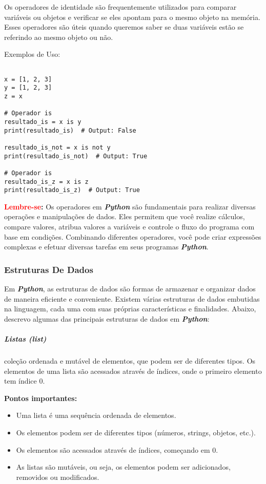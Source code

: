 \documentclass[a4paper, 12pt, onecolumn,singlespacing]{article}
\begin{document}
	Os operadores de identidade são frequentemente utilizados para comparar variáveis ou objetos e verificar se eles apontam para o mesmo objeto na memória. Esses operadores são úteis quando queremos saber se duas variáveis estão se referindo ao mesmo objeto ou não.

Exemplos de Uso:

\begin{verbatim}
		
x = [1, 2, 3]
y = [1, 2, 3]
z = x

# Operador is
resultado_is = x is y
print(resultado_is)  # Output: False

resultado_is_not = x is not y
print(resultado_is_not)  # Output: True

# Operador is
resultado_is_z = x is z
print(resultado_is_z)  # Output: True

\end{verbatim}

	\textbf{\textcolor{red}{Lembre-se}:} Os operadores em \textbf{\textit{Python}} são fundamentais para realizar diversas operações e manipulações de dados. Eles permitem que você realize cálculos, compare valores, atribua valores a variáveis e controle o fluxo do programa com base em condições. Combinando diferentes operadores, você pode criar expressões complexas e efetuar diversas tarefas em seus programas \textbf{\textit{Python}}.
	
	\subsubsection{Estruturas De Dados}
	Em \textbf{\textit{Python}}, as estruturas de dados são formas de armazenar e organizar dados de maneira eficiente e conveniente. Existem várias estruturas de dados embutidas na linguagem, cada uma com suas próprias características e finalidades. Abaixo, descrevo algumas das principais estruturas de dados em \textbf{\textit{Python}}:
	
	\subparagraph{Listas (\textit{list})} coleção ordenada e mutável de elementos, que podem ser de diferentes tipos. Os elementos de uma lista são acessados através de índices, onde o primeiro elemento tem índice 0.
	
	\textbf{Pontos importantes:}
	\begin{itemize}
		\item Uma lista é uma sequência ordenada de elementos.
		\item Os elementos podem ser de diferentes tipos (números, strings, objetos, etc.).
		\item Os elementos são acessados através de índices, começando em 0.
		\item As listas são mutáveis, ou seja, os elementos podem ser adicionados, removidos ou modificados.
	\end{itemize}
	
\end{document}
